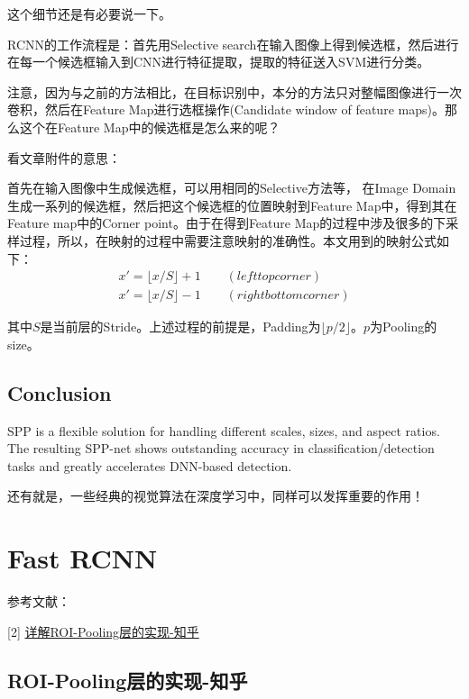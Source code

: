 这个细节还是有必要说一下。

RCNN的工作流程是：首先用Selective search在输入图像上得到候选框，然后进行在每一个候选框输入到CNN进行特征提取，提取的特征送入SVM进行分类。

注意，因为与之前的方法相比，在目标识别中，本分的方法只对整幅图像进行一次卷积，然后在Feature Map进行选框操作(Candidate window of feature maps)。那么这个在Feature Map中的候选框是怎么来的呢？

看文章附件的意思：

首先在输入图像中生成候选框，可以用相同的Selective方法等， 在Image Domain生成一系列的候选框，然后把这个候选框的位置映射到Feature Map中，得到其在Feature map中的Corner point。由于在得到Feature Map的过程中涉及很多的下采样过程，所以，在映射的过程中需要注意映射的准确性。本文用到的映射公式如下：
\begin{displaymath}
\begin{gathered}
x' = \lfloor x/S  \rfloor + 1 \qquad  (left top corner)\\
x' = \lfloor x/S \rfloor - 1 \qquad (right bottom corner)
\end{gathered}
\end{displaymath}

其中$S$是当前层的Stride。上述过程的前提是，Padding为$\lfloor p/2 \rfloor$。$p$为Pooling的size。

\subsection{Conclusion}

SPP is a flexible solution for handling different scales, sizes, and aspect ratios. The resulting SPP-net shows outstanding accuracy in classification/detection tasks and greatly accelerates DNN-based detection.

还有就是，一些经典的视觉算法在深度学习中，同样可以发挥重要的作用！

\section{Fast RCNN}

参考文献：

[2] \href{https://zhuanlan.zhihu.com/p/27640199}{详解ROI-Pooling层的实现-知乎}

\subsection{ROI-Pooling层的实现-知乎}

